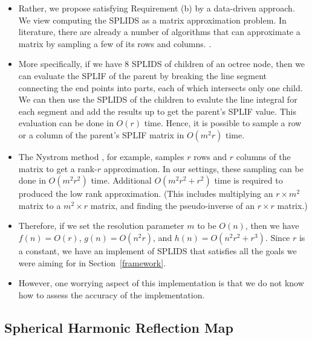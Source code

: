 \documentclass[10pt]{article}
\begin{document}
\begin{itemize}
    \item Rather, we propose satisfying Requirement (b) by
        a data-driven approach. We view computing the SPLIDS as 
        a matrix approximation problem. In literature, 
        there are already a number of algorithms that can 
        approximate a matrix by sampling a few of its rows
        and columns. \cite{kernel-nystrom, optical-computing}.
        
    \item More specifically, if we have 8 SPLIDS of children of 
        an octree node, then we can evaluate the SPLIF of
        the parent by breaking the line segment connecting
        the end points into parts, each of which intersects
        only one child. We can then use the SPLIDS of the 
        children to evalute the line integral for each
        segment and add the results up to get the parent's
        SPLIF value. This evaluation can be done in $O(r)$ time.        
        Hence, it is possible to sample a row or a column
        of the parent's SPLIF matrix in $O(m^2r)$ time.
        
    \item The Nystrom method \cite{kernel-nystrom}, for example,
        samples $r$ rows and $r$ columns of the matrix
        to get a rank-$r$ approximation. In our settings,
        these sampling can be done in $O(m^2 r^2)$ time.
        Additional $O(m^2 r^2 + r^2)$ time is required to
        produced the low rank approximation. (This includes
        multiplying an $r \times m^2$ matrix to a $m^2 \times r$ 
        matrix, and finding the pseudo-inverse of an $r \times r$
        matrix.)
        
    \item Therefore, if we set the resolution parameter $m$
        to be $O(n)$, then we have $f(n) = O(r)$,
        $g(n) = O(n^2 r)$, and $h(n) = O(n^2 r^2 + r^3).$
        Since $r$ is a constant, we have an implement
        of SPLIDS that satisfies all the goals we were
        aiming for in Section~\ref{framework}.
        
    \item However, one worrying aspect of this implementation
        is that we do not know how to assess the accuracy of
        the implementation.        
\end{itemize}

\subsection{Spherical Harmonic Reflection Map}
\end{document}
